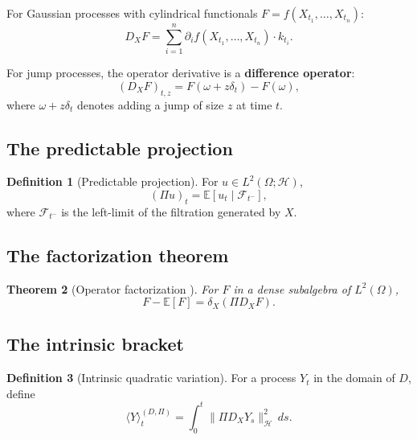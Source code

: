 \documentclass[11pt]{article}
\newtheorem{theorem}{Theorem}[section]
\theoremstyle{definition}
\newtheorem{definition}[theorem]{Definition}
\newcommand{\E}{\mathbb{E}}
\newcommand{\Hi}{\mathcal{H}}
\newcommand{\F}{\mathcal{F}}
\begin{document}
For Gaussian processes with cylindrical functionals $F = f(X_{t_1}, \ldots, X_{t_n})$:
\begin{equation}\label{eq:cylindrical}
D_X F = \sum_{i=1}^n \partial_i f(X_{t_1}, \ldots, X_{t_n}) \cdot k_{t_i}.
\end{equation}

For jump processes, the operator derivative is a \textbf{difference operator}:
\begin{equation}
(D_X F)_{t,z} = F(\omega + z\delta_t) - F(\omega),
\end{equation}
where $\omega + z\delta_t$ denotes adding a jump of size $z$ at time $t$.

\subsection{The predictable projection}

\begin{definition}[Predictable projection]
For $u \in L^2(\Omega; \Hi)$,
\begin{equation}
(\Pi u)_t = \E[u_t \mid \F_{t^-}],
\end{equation}
where $\F_{t^-}$ is the left-limit of the filtration generated by $X$.
\end{definition}

\subsection{The factorization theorem}

\begin{theorem}[Operator factorization \cite{PaperI}]\label{thm:factorization}
For $F$ in a dense subalgebra of $L^2(\Omega)$,
\begin{equation}
F - \E[F] = \delta_X(\Pi D_X F).
\end{equation}
\end{theorem}

\subsection{The intrinsic bracket}

\begin{definition}[Intrinsic quadratic variation]
For a process $Y_t$ in the domain of $D$, define
\begin{equation}
\langle Y \rangle^{(D,\Pi)}_t = \int_0^t \|\Pi D_X Y_s\|^2_\Hi\,ds.
\end{equation}
\end{definition}
\end{document}
